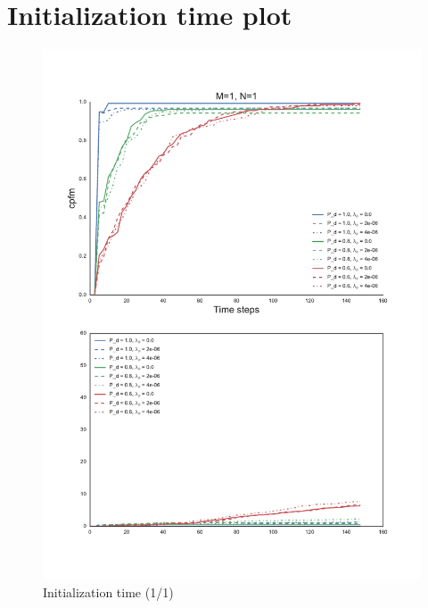 
\chapter{Initialization time plot}
{
\setlength{\intextsep}{0mm}
\begin{figure}[H]
\centering
\includegraphics[height = .9\textheight]{Figures/plots/Scenario1_Init-Time(1-1).pdf}
\caption{Initialization time (1/1)}\label{fig:init_time_1-1}
\end{figure}

}
